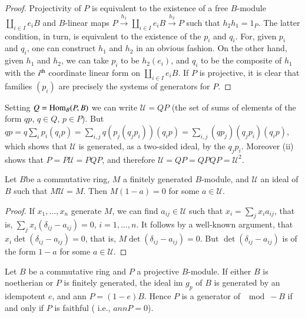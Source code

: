 \begin{proof}
Projectivity of $P$ is equivalent to the existence of a free
$B$-module $\coprod_{i \in I} e_i B$ and $B$-linear maps $P
\xrightarrow{h_1} \coprod\limits_{i \in I} e_i B \xrightarrow{h_2} P$
such that $h_2 h_1 = 1_P$. The latter condition, in turn, is
equivalent to the existence of the $p_i$ and $q_i$. For, given $p_i$
and $q_i$, one can construct $h_1$ and $h_2$ in an obvious fashion. On
the other hand, given $h_1$ and $h_2$, we can take $p_i$ to be
$h_2(e_i)$, and $q_i$ to be the composite of $h_1$ with the $i^{\rm th}$
coordinate linear form on $\coprod\limits_{ i \in I} e_i B$. If $P$
is projective, it is clear that families $(p_i)$ are precisely the
systems of generators for $P$.  
\end{proof}

Setting $Q = \operatorname{Hom}_B (P, B)$ we can write $\mathscr{U} = QP$ (the set
of sums of elements of the form $qp$, $q \in Q$, $p \in P$). But $qp=
q \sum\limits_i p_i (q_i p) = \sum\limits_{ i, j} q (p_j(q_j p_i))
(q_i p) = \sum\limits_{i, j}(qp_j)(q_j p_i) (q_i p)$, which shows
that $\mathscr{U}$ is generated, as a two-sided ideal, by the $q_j
p_i$. Moreover (ii) shows that $P = P \mathscr{U} = P Q P$, and
therefore $\mathscr{U}= QP = QPQP = \mathscr{U}^2$.  

\begin{lemma}%
Let $B$\pageoriginale be a commutative ring, $M$ a finitely generated
$B$-modu\-le, and $\mathscr{U}$ an ideal of $B$ such that $M \mathscr{U}
= M$. Then $M(1 - a  ) = 0$ for some $a \in \mathscr{U}$.   
\end{lemma}

\begin{proof}
If $x_1, \ldots, x_n$ generate $M$, we can find $a_{ij}
\in\mathscr{U}$ such that $x_i = \sum\limits_j x_i a_{ij} $, that is,
$\sum\limits_j x_i (\delta_{ij} - a_{ij}) = 0$, $i = 1, \ldots, n$. It
follows by a well-known argument, that  $x_i \det ( \delta _{ij} -
a_{ij} ) = 0$, that is, $M \det (\delta_{ij} - a_{ij} ) = 0$. But
$\det (\delta_{ij} - a_{ij})$ is of the form $1- a$ for some $a \in
\mathscr{U}$. 
\end{proof}

\setcounter{prop}{8}
\begin{prop}%
Let $B$ be a commutative ring and $P$ a projective $B$-modu\-le. If
either $B$ is noetherian or $P$ is finitely generated, the ideal im
$g_p$ of $B$ is generated by an idempotent $e$, and ann $P = (1
-e)B$. Hence $P$ is a generator of $\mod - B$ if and only if $P$ is
faithful ( i.e., $ann P = 0$). 
\end{prop}

